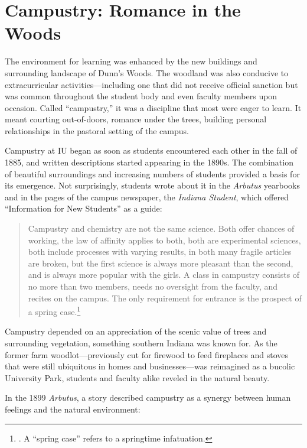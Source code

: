 \documentclass[
  american,
  letterpaper,
]{scrreprt}
\begin{document}
\section{Campustry: Romance in the
Woods}\label{campustry-romance-in-the-woods}

The environment for learning was enhanced by the new buildings and
surrounding landscape of Dunn's Woods. The woodland was also conducive
to extracurricular activities---including one that did not receive
official sanction but was common throughout the student body and even
faculty members upon occasion. Called ``campustry,'' it was a discipline
that most were eager to learn. It meant courting out-of-doors, romance
under the trees, building personal relationships in the pastoral setting
of the campus.

Campustry at IU began as soon as students encountered each other in the
fall of 1885, and written descriptions started appearing in the 1890s.
The combination of beautiful surroundings and increasing numbers of
students provided a basis for its emergence. Not surprisingly, students
wrote about it in the \emph{Arbutus} yearbooks and in the pages of the
campus newspaper, the \emph{Indiana Student}, which offered
``Information for New Students'' as a guide:

\begin{quote}
Campustry and chemistry are not the same science. Both offer chances of
working, the law of affinity applies to both, both are experimental
sciences, both include processes with varying results, in both many
fragile articles are broken, but the first science is always more
pleasant than the second, and is always more popular with the girls. A
class in campustry consists of no more than two members, needs no
oversight from the faculty, and recites on the campus. The only
requirement for entrance is the prospect of a spring case.\footnote{. A ``spring case'' refers to a springtime
  infatuation.}
\end{quote}

Campustry depended on an appreciation of the scenic value of trees and
surrounding vegetation, something southern Indiana was known for. As the
former farm woodlot---previously cut for firewood to feed fireplaces and
stoves that were still ubiquitous in homes and businesses---was
reimagined as a bucolic University Park, students and faculty alike
reveled in the natural beauty.

In the 1899 \emph{Arbutus}, a story described campustry as a synergy
between human feelings and the natural environment:
\end{document}
